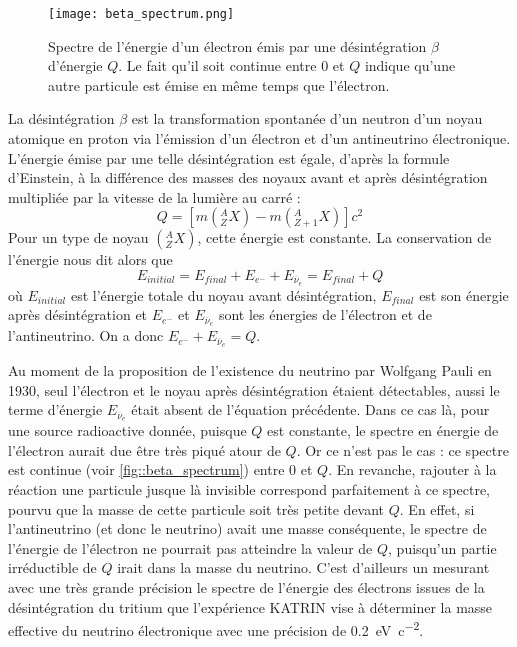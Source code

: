 	        \begin{figure}
	        	\texttt{[image: beta\_spectrum.png]}
	        	\caption[Spectre de désintégration $\beta$.]{\label{fig::beta_spectrum}Spectre de l'énergie d'un électron émis par une désintégration $\beta$ d'énergie $Q$. Le fait qu'il soit continue entre 0 et $Q$ indique qu'une autre particule est émise en même temps que l'électron.}
	        \end{figure}
	        La désintégration $\beta$ est la transformation spontanée d'un neutron d'un noyau atomique en proton via l'émission d'un électron et d'un antineutrino électronique. L'énergie émise par une telle désintégration est égale, d'après la formule d'Einstein, à la différence des masses des noyaux avant et après désintégration multipliée par la vitesse de la lumière au carré : 
	        \begin{equation}
	        	Q = \left[m\left(^A_Z X\right)-m\left(^A_{Z+1} X\right)\right]c^2
	        \end{equation}
	        Pour un type de noyau $\left(^A_Z X\right)$, cette énergie est constante. La conservation de l'énergie nous dit alors que
	        \begin{equation}
	        	E_{initial} = E_{final} +E_{e^-}+E_{\overline{\nu}_e} = E_{final}+Q
	        \end{equation}
	        où $E_{initial}$ est l'énergie totale du noyau avant désintégration, $E_{final}$ est son énergie après désintégration et $E_{e^-}$ et $E_{\overline{\nu}_e}$ sont les énergies de l'électron et de l'antineutrino. On a donc $E_{e^-}+E_{\overline{\nu}_e} = Q$.
	        
	         Au moment de la proposition de l'existence du neutrino par Wolfgang Pauli en 1930\cite{Pauli1930}, seul l'électron et le noyau après désintégration étaient détectables, aussi le terme d'énergie $E_{\overline{\nu}_e}$ était absent de l'équation précédente. Dans ce cas là, pour une source radioactive donnée, puisque $Q$ est constante, le spectre en énergie de l'électron aurait due être très piqué atour de $Q$. Or ce n'est pas le cas : ce spectre est continue (voir \autoref{fig::beta_spectrum}) entre 0 et $Q$. En revanche, rajouter à la réaction une particule jusque là invisible correspond parfaitement à ce spectre, pourvu que la masse de cette particule soit très petite devant $Q$. En effet, si l'antineutrino (et donc le neutrino) avait une masse conséquente, le spectre de l'énergie de l'électron ne pourrait pas atteindre la valeur de $Q$, puisqu'un partie irréductible de $Q$ irait dans la masse du neutrino. C'est d'ailleurs un mesurant avec une très grande précision le spectre de l'énergie des électrons issues de la désintégration du tritium que l'expérience KATRIN\cite{Kleesiek2018} vise à déterminer la masse effective du neutrino électronique avec une précision de \SI{0.2}{\electronvolt\per c\squared}.
    
